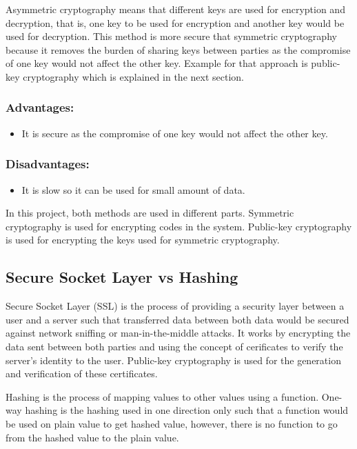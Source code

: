 Asymmetric cryptography means that different keys are used for encryption and decryption, that is, one key to be used for encryption and another key would be used for decryption. This method is more secure that symmetric cryptography because it removes the burden of sharing keys between parties as the compromise of one key would not affect the other key. Example for that approach is public-key cryptography which is explained in the next section.

\subsubsection{Advantages:}
\begin{itemize}
	\item It is secure as the compromise of one key would not affect the other key.
\end{itemize}

\subsubsection{Disadvantages:}
\begin{itemize}
	\item It is slow so it can be used for small amount of data.
\end{itemize}

In this project, both methods are used in different parts. Symmetric cryptography is used for encrypting codes in the system. Public-key cryptography is used for encrypting the keys used for symmetric cryptography.

\subsection{Secure Socket Layer vs Hashing}
Secure Socket Layer (SSL) is the process of providing a security layer between a user and a server such that transferred data between both data would be secured against network sniffing or man-in-the-middle attacks. It works by encrypting the data sent between both parties and using the concept of cerificates to verify the server's identity to the user. Public-key cryptography is used for the generation and verification of these certificates.

Hashing is the process of mapping values to other values using a function. One-way hashing is the hashing used in one direction only such that a function would be used on plain value to get hashed value, however, there is no function to go from the hashed value to the plain value.

